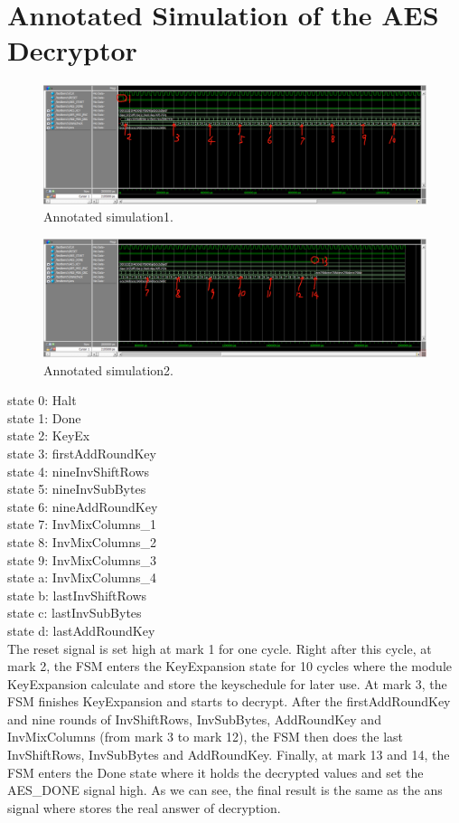\documentclass[12pt]{article}
\begin{document}
\section{Annotated Simulation of the AES Decryptor}
\begin{figure}[H]
    \centering
    \includegraphics[width=18cm]{simulation1.png}
    \caption{Annotated simulation1.}
\end{figure}
\begin{figure}[H]
    \centering
    \includegraphics[width=18cm]{simulation2.png}
    \caption{Annotated simulation2.}
\end{figure}
state 0: Halt\\
state 1: Done\\
state 2: KeyEx\\
state 3: firstAddRoundKey\\
state 4: nineInvShiftRows\\
state 5: nineInvSubBytes\\
state 6: nineAddRoundKey\\
state 7: InvMixColumns\_1\\
state 8: InvMixColumns\_2\\
state 9: InvMixColumns\_3\\
state a: InvMixColumns\_4\\
state b: lastInvShiftRows\\
state c: lastInvSubBytes\\
state d: lastAddRoundKey\\

The reset signal is set high at mark 1 for one cycle. Right after this cycle, at mark 2, the FSM enters the KeyExpansion state for 10 cycles where the module KeyExpansion calculate and store the keyschedule for later use. At mark 3, the FSM finishes KeyExpansion and starts to decrypt. After the firstAddRoundKey and nine rounds of InvShiftRows, InvSubBytes, AddRoundKey and InvMixColumns (from mark 3 to mark 12), the FSM then does the last InvShiftRows, InvSubBytes and AddRoundKey.
Finally, at mark 13 and 14, the FSM enters the Done state where it holds the decrypted values and set the AES\_DONE signal high. As we can see, the final result is the same as the ans signal where stores the real answer of decryption.
\end{document}
